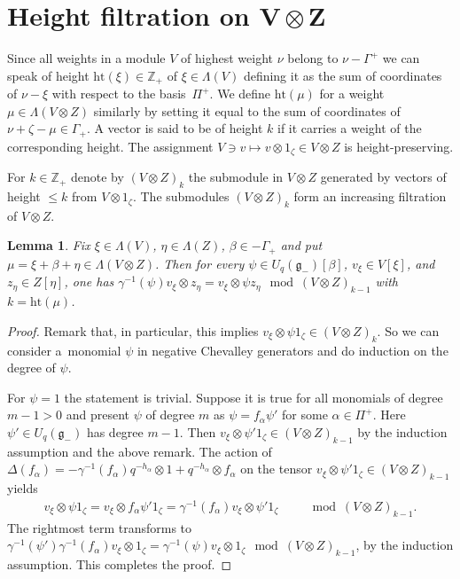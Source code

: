 \documentclass[pdftex]{sigma}
\numberwithin{equation}{section}
\newtheorem{Lemma}[Theorem]{Lemma}
\begin{document}
\section[Height filtration on $V\otimes Z$]{Height filtration on $\boldsymbol{V\otimes Z}$}

Since all weights in a module $V$ of highest weight $\nu$ belong to $\nu-\Gamma^+$ we can speak of height $\mathrm{ht}(\xi)\in \mathbb{Z}_+$ of $\xi\in \Lambda(V)$ defining it as the sum of coordinates of $\nu-\xi$ with respect to the basis~$\Pi^+$. We define $\mathrm{ht}(\mu)$ for a weight $\mu\in \Lambda(V\otimes Z)$ similarly by setting it equal to the sum of coordinates of $\nu+\zeta-\mu\in \Gamma_+$. A vector is said to be of height $k$ if it carries a weight of the corresponding height. The assignment $V\ni v\mapsto v\otimes 1_\zeta\in V\otimes Z$ is height-preserving.

For $k\in \mathbb{Z}_+$ denote by $(V\otimes Z)_k$ the submodule in $V\otimes Z$ generated by vectors of height $\leqslant k$ from $V\otimes 1_\zeta$. The submodules $(V\otimes Z)_k$ form an increasing filtration of $V\otimes Z$.
\begin{Lemma}\label{diagonal}Fix $\xi\in \Lambda(V)$, $\eta\in \Lambda(Z)$, $\beta\in -\Gamma_+$ and put $\mu=\xi+\beta+\eta \in\Lambda(V\otimes Z)$. Then for every $\psi \in U_q(\mathfrak{g}_-)[\beta]$, $v_\xi\in V[\xi]$, and $z_\eta\in Z[\eta]$, one has $\gamma^{-1}(\psi) v_\xi\otimes z_\eta = v_\xi\otimes \psi z_\eta \mod (V\otimes Z)_{k-1}$ with $k=\mathrm{ht}(\mu)$.
\end{Lemma}
\begin{proof}Remark that, in particular, this implies $v_\xi\otimes \psi 1_\zeta \in (V\otimes Z)_{k}$. So we can consider a~monomial $\psi$ in negative Chevalley generators and do induction on the degree of $\psi$.

For $\psi=1$ the statement is trivial. Suppose it is true for all monomials of degree $m-1>0$ and present $\psi$ of degree $m$ as $\psi= f_{\alpha} \psi'$ for some $\alpha \in \Pi^+$. Here $\psi'\in U_q(\mathfrak{g}_-)$ has
degree $m-1$. Then $v_\xi\otimes \psi' 1_\zeta \in (V\otimes Z)_{k-1}$ by the induction assumption and the above remark. The action of $\Delta(f_\alpha)=- \gamma^{-1}(f_{\alpha} )q^{-h_\alpha}\otimes 1+q^{-h_\alpha}\otimes f_\alpha$ on the tensor $v_\xi\otimes \psi' 1_\zeta\in (V\otimes Z)_{k-1}$ yields
\begin{gather*}
 v_\xi\otimes\psi 1_\zeta= v_\xi\otimes f_\alpha \psi' 1_\zeta=\gamma^{-1}(f_{\alpha}) v_\xi\otimes \psi' 1_\zeta \qquad \mod (V\otimes Z)_{k-1}.
\end{gather*}
The rightmost term transforms to $\gamma^{-1}(\psi')\gamma^{-1}(f_{\alpha}) v_\xi\otimes 1_\zeta=\gamma^{-1}(\psi) v_\xi\otimes 1_\zeta \mod(V\otimes Z)_{k-1}$, by the induction assumption. This completes the proof.
\end{proof}
\end{document}
